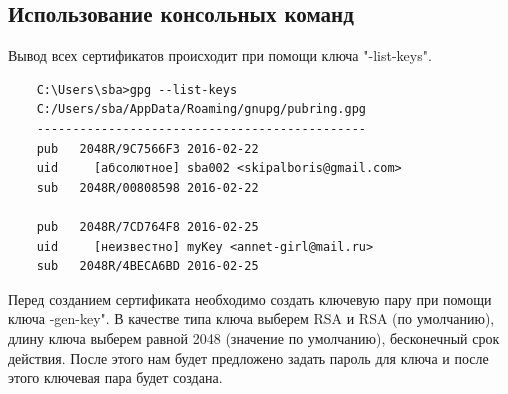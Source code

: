 \documentclass[10pt,a4paper]{report}
\begin{document}
\subsection{Использование консольных команд}
Вывод всех сертификатов происходит при помощи ключа "\--list-keys".
\begin{verbatim}
	C:\Users\sba>gpg --list-keys
	C:/Users/sba/AppData/Roaming/gnupg/pubring.gpg
	----------------------------------------------
	pub   2048R/9C7566F3 2016-02-22
	uid     [абсолютное] sba002 <skipalboris@gmail.com>
	sub   2048R/00808598 2016-02-22
	
	pub   2048R/7CD764F8 2016-02-25
	uid     [неизвестно] myKey <annet-girl@mail.ru>
	sub   2048R/4BECA6BD 2016-02-25
\end{verbatim}

Перед созданием сертификата необходимо создать ключевую пару при помощи ключа \--gen-key". В качестве типа ключа выберем RSA и RSA (по умолчанию), длину ключа выберем равной 2048 (значение по умолчанию), бесконечный срок действия. После этого нам будет предложено задать пароль для ключа и после этого ключевая пара будет создана.
\end{document}
